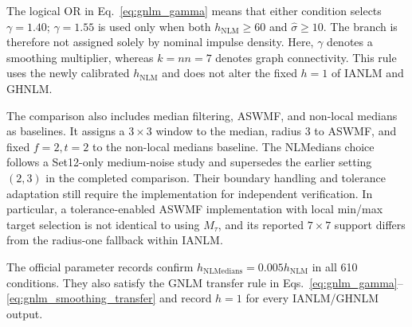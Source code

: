 \documentclass[pdflatex,iicol,sn-mathphys-num]{sn-jnl}
\newif\ifshowportuguese
\newcommand{\pt}[1]{\ifshowportuguese\par\begingroup\small\color{blue!55!black}\noindent\textbf{PT: }#1\par\endgroup\fi}
\begin{document}
The logical OR in Eq.~\eqref{eq:gnlm_gamma} means that either condition selects $\gamma=1.40$; $\gamma=1.55$ is used only when both $h_{\mathrm{NLM}}\geq60$ and $\hat{\sigma}\geq10$. The branch is therefore not assigned solely by nominal impulse density. Here, $\gamma$ denotes a smoothing multiplier, whereas $k=nn=7$ denotes graph connectivity. This rule uses the newly calibrated $h_{\mathrm{NLM}}$ and does not alter the fixed $h=1$ of IANLM and GHNLM.
\pt{O OU lógico na Eq.~\eqref{eq:gnlm_gamma} significa que qualquer uma das condições seleciona $\gamma=1.40$; $\gamma=1.55$ é usado somente quando $h_{\mathrm{NLM}}\geq60$ e $\hat{\sigma}\geq10$ simultaneamente. Portanto, o ramo não é definido apenas pela densidade nominal de impulsos. Aqui, $\gamma$ denota um multiplicador de suavização, enquanto $k=nn=7$ denota a conectividade do grafo. Essa regra usa o $h_{\mathrm{NLM}}$ recém-calibrado e não altera o $h=1$ fixo do IANLM e GHNLM.}

The comparison also includes median filtering, ASWMF, and non-local medians as baselines. It assigns a $3\times3$ window to the median, radius 3 to ASWMF, and fixed $f=2,t=2$ to the non-local medians baseline. The NLMedians choice follows a Set12-only medium-noise study and supersedes the earlier setting $(2,3)$ in the completed comparison. Their boundary handling and tolerance adaptation still require the implementation for independent verification. In particular, a tolerance-enabled ASWMF implementation with local min/max target selection is not identical to using $M_\tau$, and its reported $7\times7$ support differs from the radius-one fallback within IANLM.
\pt{A comparação também inclui filtro de mediana, ASWMF e non-local medians como baselines. Ele atribui janela $3\times3$ à mediana, raio 3 ao ASWMF e $f=2,t=2$ fixos ao baseline non-local medians. A escolha do NLMedians decorre de um estudo Set12-only sob ruído médio e substitui a configuração anterior $(2,3)$ na comparação concluída. O tratamento de bordas e a adaptação da tolerância ainda exigem a implementação para verificação independente. Em particular, uma implementação ASWMF com tolerância e seleção de alvos por mínimo/máximo local não é idêntica ao uso de $M_\tau$, e seu suporte informado de $7\times7$ difere do fallback de raio um dentro do IANLM.}

The official parameter records confirm $h_{\mathrm{NLMedians}}=0.005h_{\mathrm{NLM}}$ in all 610 conditions. They also satisfy the GNLM transfer rule in Eqs.~\eqref{eq:gnlm_gamma}--\eqref{eq:gnlm_smoothing_transfer} and record $h=1$ for every IANLM/GHNLM output.
\pt{Os registros oficiais de parâmetros confirmam $h_{\mathrm{NLMedians}}=0.005h_{\mathrm{NLM}}$ nas 610 condições. Eles também satisfazem a regra de transferência GNLM nas Eqs.~\eqref{eq:gnlm_gamma}--\eqref{eq:gnlm_smoothing_transfer} e registram $h=1$ para todas as saídas IANLM/GHNLM.}
\end{document}

